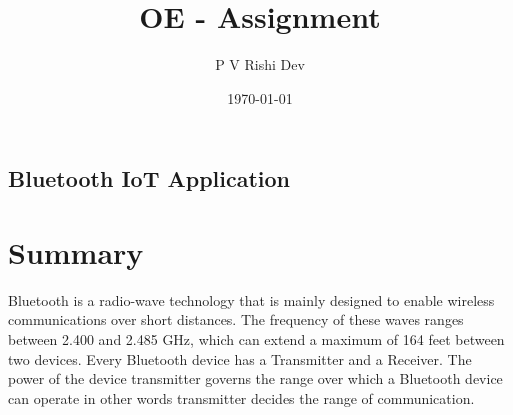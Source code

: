 \documentclass{report}
\title{OE - Assignment}
\author{P V Rishi Dev}
\date{\today}
\begin{document}
    
    
    \begin{center}
        \section*{Bluetooth IoT Application}
    \end{center}
\setlength{\columnsep}{1.0cm}
    \large
    \section*{Summary}
    Bluetooth is a radio-wave technology that is mainly designed to enable wireless communications over short distances. The frequency of these waves ranges between 2.400 and 2.485 GHz, which can extend a maximum of 164 feet between two devices. Every Bluetooth device has a Transmitter and a Receiver. The power of the device transmitter governs the range over which a Bluetooth device can operate in other words transmitter decides the range of communication.
    
\end{document}
